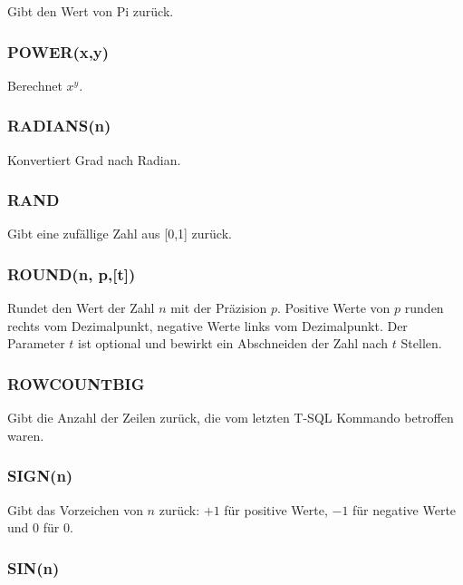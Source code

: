 \documentclass[12pt,ngerman,a4paper,index=totoc,twoside]{scrartcl}
\begin{document}
Gibt den Wert von Pi zurück.

\subsubsection{POWER(x,y)}

Berechnet $x^y$.

\subsubsection{RADIANS(n)}

Konvertiert Grad nach Radian.

\subsubsection{RAND}

Gibt eine zufällige Zahl aus [0,1] zurück.


\subsubsection{ROUND(n, p,[t])}

Rundet den Wert der Zahl $n$ mit der Präzision $p$. Positive Werte von $p$ runden rechts vom Dezimalpunkt, negative Werte links vom Dezimalpunkt. Der Parameter $t$ ist optional und bewirkt ein Abschneiden der Zahl nach $t$ Stellen.

\subsubsection{ROWCOUNT\textunderscore BIG}

Gibt die Anzahl der Zeilen zurück, die vom letzten T-SQL Kommando betroffen waren.

\subsubsection{SIGN(n)}

Gibt das Vorzeichen von $n$ zurück: $+1$ für positive Werte, $-1$ für negative Werte und $0$ für $0$.

\subsubsection{SIN(n)}
\end{document}
